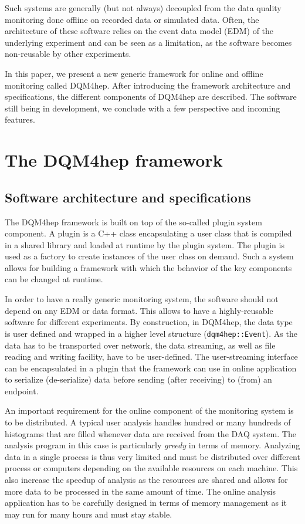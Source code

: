 \documentclass{webofc}
\begin{document}
Such systems are generally (but not always) decoupled from the data quality monitoring done offline on recorded data or simulated data.
Often, the architecture of these software relies on the event data model (EDM) of the underlying experiment and 
can be seen as a limitation, as the software becomes non-reusable by other experiments.

In this paper, we present a new generic framework for online and offline monitoring called DQM4hep. 
After introducing the framework architecture and specifications, the different components of DQM4hep are described. 
The software still being in development, we conclude with a few perspective and incoming features.

\section{The DQM4hep framework}
\label{sec:framework}

\subsection{Software architecture and specifications}
\label{subsec:arch}

The DQM4hep framework is built on top of the so-called plugin system component. 
A plugin is a C++ class encapsulating a user class that is compiled in a shared library and loaded at runtime by the plugin system. 
The plugin is used as a factory to create instances of the user class on demand.
Such a system allows for building a framework with which the behavior of the key components can be changed at runtime. 

In order to have a really generic monitoring system, the software should not depend on any EDM or data format. 
This allows to have a highly-reusable software for different experiments. 
By construction, in DQM4hep, the data type is user defined and wrapped in a higher level structure (\texttt{dqm4hep::Event}). 
As the data has to be transported over network, the data streaming, as well as file reading and writing facility, have to be user-defined.
The user-streaming interface can be encapsulated in a plugin that the framework can use in online application to serialize (de-serialize) data before sending (after receiving) to (from) an endpoint.

An important requirement for the online component of the monitoring system is to be distributed. 
A typical user analysis handles hundred or many hundreds of histograms that are filled whenever data are received from the DAQ system. 
The analysis program in this case is particularly \textit{greedy} in terms of memory. 
Analyzing data in a single process is thus very limited and must be distributed over different process or computers depending on the available resources on each machine.
This also increase the speedup of analysis as the resources are shared and allows for more data to be processed in the same amount of time.
The online analysis application has to be carefully designed in terms of memory management as it may run for many hours and must stay stable.
\end{document}

